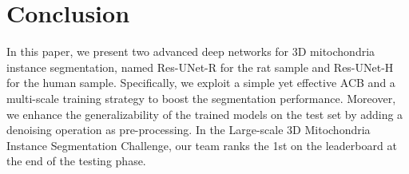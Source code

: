 \documentclass{article}
\begin{document}
\section{Conclusion}
\label{sec:conclusion}
In this paper, we present two advanced deep networks for 3D mitochondria instance segmentation, named Res-UNet-R for the rat sample and Res-UNet-H for the human sample.  Specifically, we exploit a simple yet effective ACB and  a multi-scale training strategy to boost the segmentation performance.  Moreover, we enhance the generalizability of the trained models on the test set by adding a denoising operation as pre-processing. In the Large-scale 3D Mitochondria Instance Segmentation Challenge, our team ranks the 1st on the leaderboard at the end of the testing phase.




\footnotesize


\end{document}
